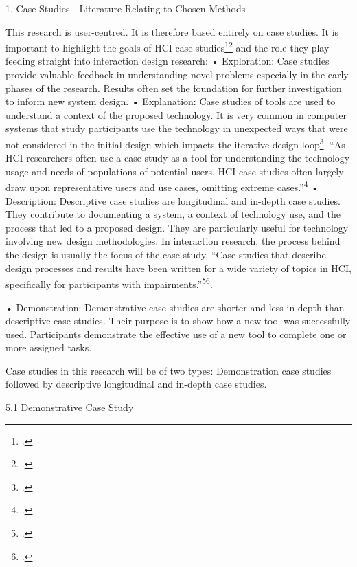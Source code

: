 1.	Case Studies - Literature Relating to Chosen Methods  

This research is user-centred. It is therefore based entirely on case studies. It is important to highlight the goals of HCI case studies\footcite{Lazar2010}\footcite{Cox2008} and the role they play feeding straight into interaction design research:
•	Exploration: Case studies provide valuable feedback in understanding novel problems especially in the early phases of the research.  Results often set the foundation for further investigation to inform new system design. 
•	Explanation: Case studies of tools are used to understand a context of the proposed technology.  It is very common in computer systems that study participants use the technology in unexpected ways that were not considered in the initial design which impacts the iterative design loop\footcite{Klasnja2011}.     
“As HCI researchers often use a case study as a tool for understanding the technology usage and needs of populations of potential users, HCI case studies often largely draw upon representative users and use cases, omitting extreme cases.”\footcite{Lazar2010}
•	Description: Descriptive case studies are longitudinal and in-depth case studies.  They contribute to documenting a system, a context of technology use, and the process that led to a proposed design. They are particularly useful for technology involving new design methodologies. In interaction  research, the process behind the design is usually the focus of the case study.  “Case studies that describe design processes and results have been written for a wide variety of topics in HCI, specifically for participants with impairments.”\footcite{Lazar2010}\footcite{Cox2008}.  

•	Demonstration: Demonstrative case studies are shorter and less in-depth than descriptive case studies.  Their purpose is to show how a new tool was successfully used.  Participants demonstrate the effective use of a new tool to complete one or more assigned tasks.  

Case studies in this research will be of two types: Demonstration case studies followed by descriptive longitudinal and in-depth case studies.

5.1 Demonstrative Case Study 

